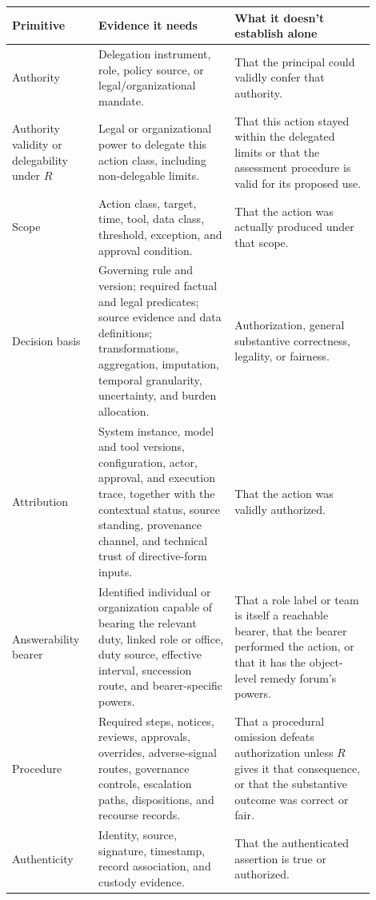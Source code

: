 \begin{table}[tbp]
\small
\centering
\begin{tabular}{>{\raggedright\arraybackslash}p{0.21\linewidth}%
                >{\raggedright\arraybackslash}p{0.34\linewidth}%
                >{\raggedright\arraybackslash}p{0.35\linewidth}}
\toprule
Primitive & Evidence it needs & What it doesn't establish alone \\
\midrule
Authority & Delegation instrument, role, policy source, or legal/organizational mandate. & That the principal could validly confer that authority. \\
Authority validity or delegability under \(R\) & Legal or organizational power to delegate this action class, including non-delegable limits. & That this action stayed within the delegated limits or that the assessment procedure is valid for its proposed use. \\
Scope & Action class, target, time, tool, data class, threshold, exception, and approval condition. & That the action was actually produced under that scope. \\
Decision basis & Governing rule and version; required factual and legal predicates; source evidence and data definitions; transformations, aggregation, imputation, temporal granularity, uncertainty, and burden allocation. & Authorization, general substantive correctness, legality, or fairness. \\
Attribution & System instance, model and tool versions, configuration, actor, approval, and execution trace, together with the contextual status, source standing, provenance channel, and technical trust of directive-form inputs. & That the action was validly authorized. \\
Answerability bearer & Identified individual or organization capable of bearing the relevant duty, linked role or office, duty source, effective interval, succession route, and bearer-specific powers. & That a role label or team is itself a reachable bearer, that the bearer performed the action, or that it has the object-level remedy forum's powers. \\
Procedure & Required steps, notices, reviews, approvals, overrides, adverse-signal routes, governance controls, escalation paths, dispositions, and recourse records. & That a procedural omission defeats authorization unless \(R\) gives it that consequence, or that the substantive outcome was correct or fair. \\
Authenticity & Identity, source, signature, timestamp, record association, and custody evidence. & That the authenticated assertion is true or authorized. \\

\end{tabular}
\end{table}
